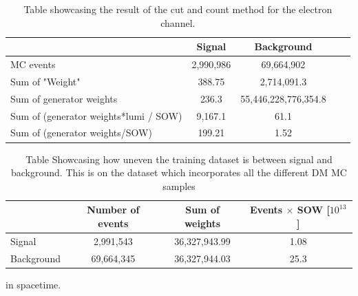 \documentclass[14pt, a4paper]{book}
\begin{document}
\clearpage
\begin{table}[!h]
   \centering
   \begin{tabular}{l|c|c|c|r}\midrule\midrule
                                                & Signal     & Background \\\midrule
        MC events                               & 2,990,986  & 69,664,902 \\
        Sum of "Weight"                         & 388.75     & 2,714,091.3 \\
        Sum of generator weights                & 236.3      & 55,446,228,776,354.8 \\
        Sum of (generator weights*lumi / SOW)   & 9,167.1    & 61.1 \\
        Sum of (generator weights/SOW)          & 199.21    & 1.52 \\\midrule\midrule
   \end{tabular}
   \caption[Cut and count significance ee]{Table showcasing the result of the cut and count method for the electron channel.}
\end{table}

\begin{table}[!h]
    \centering
    \begin{tabular}{l|c|c|c}\midrule\midrule
                    & Number of events & Sum of weights & Events $\times$ SOW [$10^{13}$]\\\midrule
         Signal     & 2,991,543        & 36,327,943.99  & 1.08\\
         Background & 69,664,345       & 36,327,944.03  & 25.3 \\ \midrule\midrule
    \end{tabular}
    \caption[Unbalanced DM training dataset]{Table Showcasing how uneven the training dataset is between signal and background. This is on the dataset which incorporates all the different DM MC samples}
    \label{tab:UnbalancedDMTraining}
\end{table}
in spacetime.

\clearpage
\printbibliography
\end{document}
